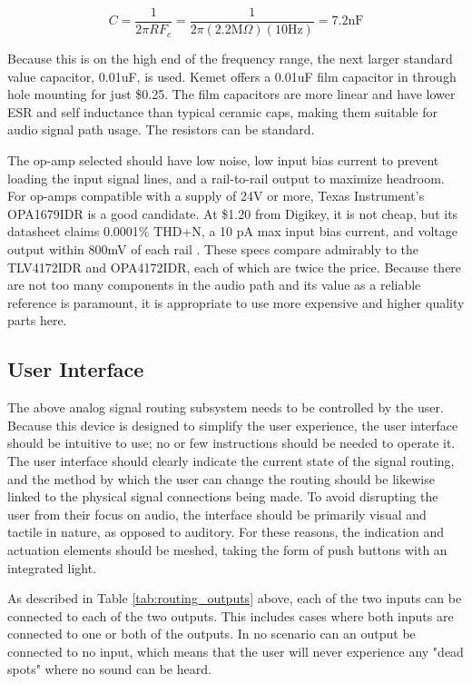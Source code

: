 \documentclass{article}
\begin{document}
	$$ C = \frac{1}{2\pi R F_c} = \frac{1}{2\pi (2.2 \text{M}\Omega) (10 \text{Hz})} = 7.2 \text{nF}$$

	Because this is on the high end of the frequency range, the next larger standard value capacitor, 0.01uF, is used.  Kemet offers a 0.01uF film capacitor in through hole mounting for just \$0.25.  The film capacitors are more linear and have lower ESR and self inductance than typical ceramic caps, making them suitable for audio signal path usage.  The resistors can be standard.

	The op-amp selected should have low noise, low input bias current to prevent loading the input signal lines, and a rail-to-rail output to maximize headroom.  For op-amps compatible with a supply of 24V or more, Texas Instrument's OPA1679IDR is a good candidate.  At \$1.20 from Digikey, it is not cheap, but its datasheet claims 0.0001\% THD+N, a 10 pA max input bias current, and voltage output within 800mV of each rail \cite{datasheet:OPA1679IDR}.  These specs compare admirably to the TLV4172IDR and OPA4172IDR, each of which are twice the price.  Because there are not too many components in the audio path and its value as a reliable reference is paramount, it is appropriate to use more expensive and higher quality parts here.

	\subsection{User Interface}

	The above analog signal routing subsystem needs to be controlled by the user.  Because this device is designed to simplify the user experience, the user interface should be intuitive to use; no or few instructions should be needed to operate it.  The user interface should clearly indicate the current state of the signal routing, and the method by which the user can change the routing should be likewise linked to the physical signal connections being made.  To avoid disrupting the user from their focus on audio, the interface should be primarily visual and tactile in nature, as opposed to auditory.  For these reasons, the indication and actuation elements should be meshed, taking the form of push buttons with an integrated light.

	As described in Table \ref{tab:routing_outputs} above, each of the two inputs can be connected to each of the two outputs.  This includes cases where both inputs are connected to one or both of the outputs.  In no scenario can an output be connected to no input, which means that the user will never experience any "dead spots" where no sound can be heard.
\end{document}
